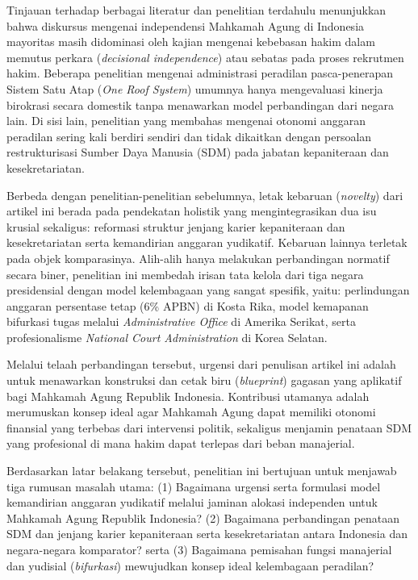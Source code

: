 \documentclass[12pt, a4paper]{article}
\begin{document}
Tinjauan terhadap berbagai literatur dan penelitian terdahulu menunjukkan bahwa diskursus mengenai independensi Mahkamah Agung di Indonesia mayoritas masih didominasi oleh kajian mengenai kebebasan hakim dalam memutus perkara (\textit{decisional independence}) atau sebatas pada proses rekrutmen hakim. Beberapa penelitian mengenai administrasi peradilan pasca-penerapan Sistem Satu Atap (\textit{One Roof System}) umumnya hanya mengevaluasi kinerja birokrasi secara domestik tanpa menawarkan model perbandingan dari negara lain. Di sisi lain, penelitian yang membahas mengenai otonomi anggaran peradilan sering kali berdiri sendiri dan tidak dikaitkan dengan persoalan restrukturisasi Sumber Daya Manusia (SDM) pada jabatan kepaniteraan dan kesekretariatan.

Berbeda dengan penelitian-penelitian sebelumnya, letak kebaruan (\textit{novelty}) dari artikel ini berada pada pendekatan holistik yang mengintegrasikan dua isu krusial sekaligus: reformasi struktur jenjang karier kepaniteraan dan kesekretariatan serta kemandirian anggaran yudikatif. Kebaruan lainnya terletak pada objek komparasinya. Alih-alih hanya melakukan perbandingan normatif secara biner, penelitian ini membedah irisan tata kelola dari tiga negara presidensial dengan model kelembagaan yang sangat spesifik, yaitu: perlindungan anggaran persentase tetap (6\% APBN) di Kosta Rika, model kemapanan bifurkasi tugas melalui \textit{Administrative Office} di Amerika Serikat, serta profesionalisme \textit{National Court Administration} di Korea Selatan.

Melalui telaah perbandingan tersebut, urgensi dari penulisan artikel ini adalah untuk menawarkan konstruksi dan cetak biru (\textit{blueprint}) gagasan yang aplikatif bagi Mahkamah Agung Republik Indonesia. Kontribusi utamanya adalah merumuskan konsep ideal agar Mahkamah Agung dapat memiliki otonomi finansial yang terbebas dari intervensi politik, sekaligus menjamin penataan SDM yang profesional di mana hakim dapat terlepas dari beban manajerial.

Berdasarkan latar belakang tersebut, penelitian ini bertujuan untuk menjawab tiga rumusan masalah utama: (1) Bagaimana urgensi serta formulasi model kemandirian anggaran yudikatif melalui jaminan alokasi independen untuk Mahkamah Agung Republik Indonesia? (2) Bagaimana perbandingan penataan SDM dan jenjang karier kepaniteraan serta kesekretariatan antara Indonesia dan negara-negara komparator? serta (3) Bagaimana pemisahan fungsi manajerial dan yudisial (\textit{bifurkasi}) mewujudkan konsep ideal kelembagaan peradilan?
\end{document}
